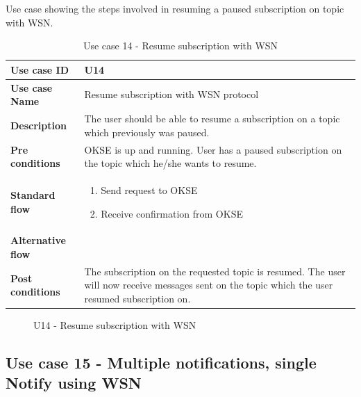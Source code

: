 Use case showing the steps involved in resuming a paused subscription on topic with WSN. 

\begin{table}[ht!]
\centering
\begin{tabular}{|l|p{5cm}|}
\hline
\textbf{Use case ID} & U14 \\ \hline
\textbf{Use case Name} & Resume subscription with WSN protocol\\ \hline
\textbf{Description} & The user should be able to resume a subscription on a topic which previously was paused. \\ \hline
\textbf{Pre conditions} & OKSE is up and running. User has a paused subscription on the topic which he/she wants to resume. \\ \hline
\textbf{Standard flow} & \begin{enumerate}
\item Send request to OKSE
\item Receive confirmation from OKSE	
\end{enumerate} \\ \hline
\textbf{Alternative flow} & \\ \hline
\textbf{Post conditions} & The subscription on the requested topic is resumed. The user will now receive messages sent on the topic which the user resumed subscription on.  \\ \hline
\end{tabular}
\caption{Use case 14 - Resume subscription with WSN}
\label{uc14}
\end{table}

\begin{center}
  \begin{figure}[ht!]
    \caption{U14 - Resume subscription with WSN}
    \label{fig:u14}
  \end{figure}
\end{center}

\clearpage

\subsection{Use case 15 - Multiple notifications, single Notify using WSN }
\label{subsec:requirements_engineering-use_cases-notify_wsn}

